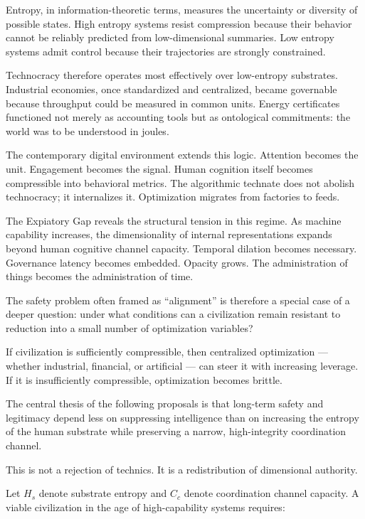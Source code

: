 \documentclass[12pt]{article}
\begin{document}
Entropy, in information-theoretic terms, measures the uncertainty or diversity of possible states. High entropy systems resist compression because their behavior cannot be reliably predicted from low-dimensional summaries. Low entropy systems admit control because their trajectories are strongly constrained.

Technocracy therefore operates most effectively over low-entropy substrates. Industrial economies, once standardized and centralized, became governable because throughput could be measured in common units. Energy certificates functioned not merely as accounting tools but as ontological commitments: the world was to be understood in joules.

The contemporary digital environment extends this logic. Attention becomes the unit. Engagement becomes the signal. Human cognition itself becomes compressible into behavioral metrics. The algorithmic technate does not abolish technocracy; it internalizes it. Optimization migrates from factories to feeds.

The Expiatory Gap reveals the structural tension in this regime. As machine capability increases, the dimensionality of internal representations expands beyond human cognitive channel capacity. Temporal dilation becomes necessary. Governance latency becomes embedded. Opacity grows. The administration of things becomes the administration of time.

The safety problem often framed as ``alignment'' is therefore a special case of a deeper question: under what conditions can a civilization remain resistant to reduction into a small number of optimization variables?

If civilization is sufficiently compressible, then centralized optimization — whether industrial, financial, or artificial — can steer it with increasing leverage. If it is insufficiently compressible, optimization becomes brittle.

The central thesis of the following proposals is that long-term safety and legitimacy depend less on suppressing intelligence than on increasing the entropy of the human substrate while preserving a narrow, high-integrity coordination channel.

This is not a rejection of technics. It is a redistribution of dimensional authority.

Let $H_s$ denote substrate entropy and $C_c$ denote coordination channel capacity. A viable civilization in the age of high-capability systems requires:
\end{document}
